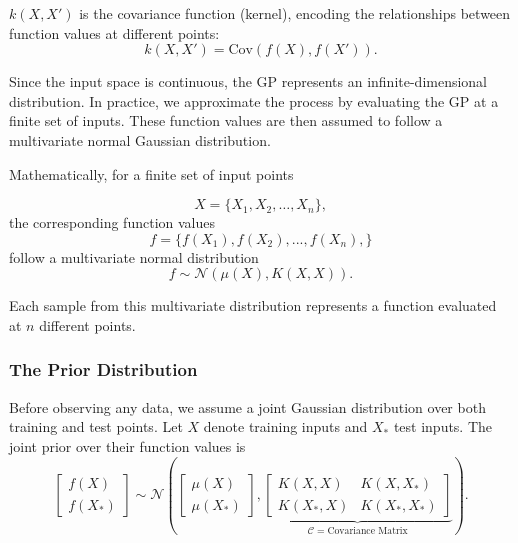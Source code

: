 \documentclass[11pt]{article}
\begin{document}
\noindent
 \( k(X, X') \) is the covariance function (kernel), encoding the relationships between function values at different points:
\begin{equation}
    k(X, X') = \text{Cov}(f(X), f(X')).
    \label{eq: kerneldef}
\end{equation}

\noindent
Since the input space is continuous, the GP represents an infinite-dimensional distribution. 
In practice, we approximate the process by evaluating the GP at a finite set of inputs.
These function values are then assumed to follow a multivariate normal Gaussian distribution.

\noindent
Mathematically, for a finite set of input points

\begin{equation}
X = \{X_1, X_2, \dots, X_n\},
\end{equation}
 the corresponding function values
\begin{equation}
f = \{f(X_1),f(X_2),...,f(X_n), \}
\end{equation}
follow a multivariate normal distribution
\begin{equation}
f \sim \mathcal{N}(\mu(X), K(X, X)).
\label{eq: Multivariate_distribution}
\end{equation}

\noindent
Each sample from this multivariate distribution represents a function evaluated at \( n \) different points.

\subsubsection*{The Prior Distribution}
\label{sec: prior_dist}

Before observing any data, we assume a joint Gaussian distribution over both training and test points. Let \( X \) denote training inputs and \( X_* \) test inputs. 
The joint prior over their function values is
\begin{equation}
\begin{bmatrix}
f(X) \\
f(X_*)
\end{bmatrix}
\sim \mathcal{N}
\left(
\begin{bmatrix}
\mu(X) \\
\mu(X_*)
\end{bmatrix},
\underbrace{
\begin{bmatrix}
K(X, X) & K(X, X_*) \\
K(X_*, X) & K(X_*, X_*)
\end{bmatrix}
}_{\mathcal{C} = \text{Covariance Matrix}}
\right).
\label{eq: Multivariate prior}
\end{equation}
\end{document}
